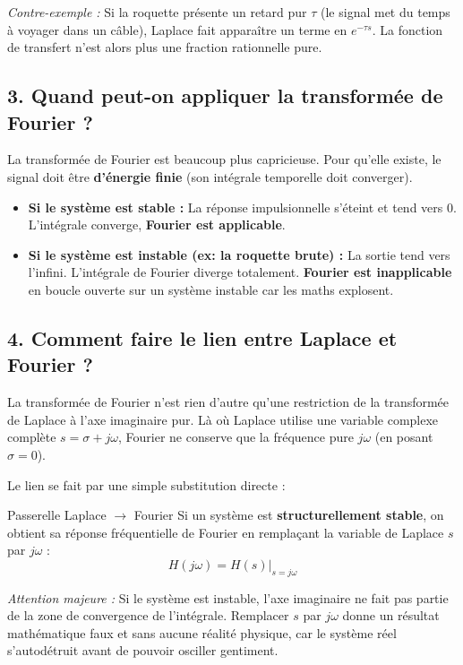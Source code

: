 \documentclass[11pt,a4paper]{report}
\begin{document}
\textit{Contre-exemple :} Si la roquette présente un retard pur $\tau$ (le signal met du temps à voyager dans un câble), Laplace fait apparaître un terme en $e^{-\tau s}$. La fonction de transfert n'est alors plus une fraction rationnelle pure.

\subsection{3. Quand peut-on appliquer la transformée de Fourier ?}
La transformée de Fourier est beaucoup plus capricieuse. Pour qu'elle existe, le signal doit être \textbf{d'énergie finie} (son intégrale temporelle doit converger).
\begin{itemize}
    \item \textbf{Si le système est stable :} La réponse impulsionnelle s'éteint et tend vers 0. L'intégrale converge, \textbf{Fourier est applicable}.
    \item \textbf{Si le système est instable (ex: la roquette brute) :} La sortie tend vers l'infini. L'intégrale de Fourier diverge totalement. \textbf{Fourier est inapplicable} en boucle ouverte sur un système instable car les maths explosent.
\end{itemize}

\subsection{4. Comment faire le lien entre Laplace et Fourier ?}
La transformée de Fourier n'est rien d'autre qu'une restriction de la transformée de Laplace à l'axe imaginaire pur. Là où Laplace utilise une variable complexe complète $s = \sigma + j\omega$, Fourier ne conserve que la fréquence pure $j\omega$ (en posant $\sigma = 0$).

Le lien se fait par une simple substitution directe :
\begin{importantbox}{Passerelle Laplace $\rightarrow$ Fourier}
    Si un système est \textbf{structurellement stable}, on obtient sa réponse fréquentielle de Fourier en remplaçant la variable de Laplace $s$ par $j\omega$ :
    \[ H(j\omega) = H(s) \Big|_{s = j\omega} \]
\end{importantbox}
\textit{Attention majeure :} Si le système est instable, l'axe imaginaire ne fait pas partie de la zone de convergence de l'intégrale. Remplacer $s$ par $j\omega$ donne un résultat mathématique faux et sans aucune réalité physique, car le système réel s'autodétruit avant de pouvoir osciller gentiment.
\end{document}
